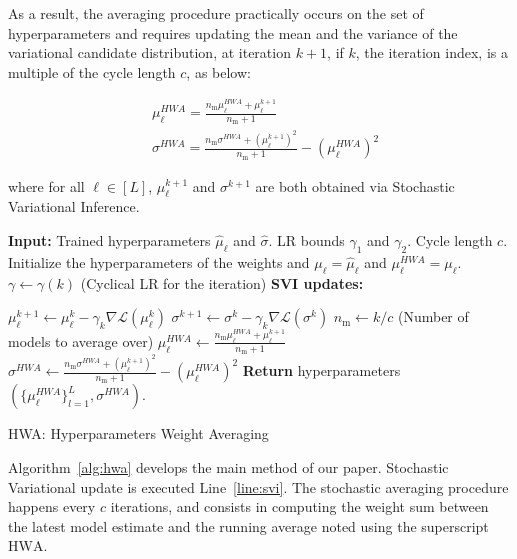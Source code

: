 \documentclass{article} %
\begin{document}
As a result, the averaging procedure practically occurs on the set of hyperparameters and requires updating the mean and the variance of the variational candidate distribution, at iteration $k+1$, if $k$, the iteration index, is a multiple of the cycle length $c$,  as below:

\begin{equation}
\begin{split}
& \mu_{\ell}^{HWA}  =  \frac{n_{\textrm{m}}\mu_{\ell}^{HWA} + \mu_{\ell}^{k+1}}{n_{\textrm{m}}+1} \\
& \sigma^{HWA}   =  \frac{n_{\textrm{m}}\sigma^{HWA} + (\mu_{\ell}^{k+1})^2}{n_{\textrm{m}}+1} -( \mu_{\ell}^{HWA})^2
\end{split}
\end{equation}

where for all $\ell \in [L]$, $\mu_{\ell}^{k+1}$ and $\sigma^{k+1}$ are both obtained via Stochastic Variational Inference.

\begin{algorithm}[H]
\begin{algorithmic}[1]
\STATE \textbf{Input:} Trained hyperparameters $\hat{\mu}_{\ell}$ and $\hat{\sigma}$. LR bounds $\gamma_1$ and $\gamma_2$. Cycle length $c$.
\STATE Initialize the hyperparameters of the weights and 
$\mu_{\ell} = \hat{\mu}_{\ell}$ and $\mu^{HWA}_{\ell} = \mu_{\ell}$.
\STATE $\gamma \leftarrow \gamma(k)$ (Cyclical LR for the iteration)
\STATE \textbf{SVI updates:}

\STATE \quad $\mu_{\ell}^{k+1} \leftarrow \mu_{\ell}^{k} - \gamma_k \nabla \mathcal{L}(\mu_{\ell}^{k})$  \label{line:svi}
\STATE \quad $\sigma^{k+1} \leftarrow \sigma^{k} - \gamma_k \nabla \mathcal{L}(\sigma^{k})$ \label{line:svisigma}
	\STATE \qquad $n_{\textrm{m}} \leftarrow k/c$ \quad (Number of models to average over)
		\STATE \quad$\mu_{\ell}^{HWA} \leftarrow \frac{n_{\textrm{m}}\mu_{\ell}^{HWA} + \mu_{\ell}^{k+1}}{n_{\textrm{m}}+1}$
		\STATE \quad $\sigma^{HWA} \leftarrow \frac{n_{\textrm{m}}\sigma^{HWA} + (\mu_{\ell}^{k+1})^2}{n_{\textrm{m}}+1} -( \mu_{\ell}^{HWA})^2 $
\ENDIF
\ENDFOR
\STATE \textbf{Return} hyperparameters $(\{\mu_{\ell}^{HWA}\}_{l=1}^L, \sigma^{HWA})$.
\end{algorithmic}
\caption{HWA: Hyperparameters Weight Averaging}
\label{alg:hwa}
\end{algorithm}

Algorithm~\ref{alg:hwa} develops the main method of our paper.
Stochastic Variational update is executed Line~\ref{line:svi}.
The stochastic averaging procedure happens every $c$ iterations, and consists in computing the weight sum between the latest model estimate and the running average noted using the superscript $\textrm{HWA}$.
\end{document}
